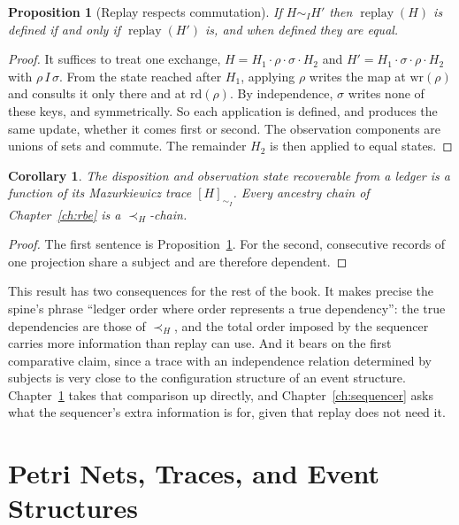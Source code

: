 \documentclass[11pt,openany]{book}
\newtheorem{proposition}[theorem]{Proposition}
\newtheorem{corollary}[theorem]{Corollary}
\theoremstyle{remark}
\newcommand{\replay}{\operatorname{replay}}
\begin{document}
\begin{proposition}[Replay respects commutation]\label{prop:commute}
If $H\sim_I H'$ then $\replay(H)$ is defined if and only if $\replay(H')$
is, and when defined they are equal.
\end{proposition}

\begin{proof}
It suffices to treat one exchange, $H=H_1\cdot\rho\cdot\sigma\cdot H_2$ and
$H'=H_1\cdot\sigma\cdot\rho\cdot H_2$ with $\rho\,I\,\sigma$. From the
state reached after $H_1$, applying $\rho$ writes the map at
$\mathrm{wr}(\rho)$ and consults it only there and at $\mathrm{rd}(\rho)$.
By independence, $\sigma$ writes none of these keys, and symmetrically. So each application is defined, and produces the same
update, whether it comes first or second. The observation components are
unions of sets and commute. The remainder $H_2$ is then applied to equal
states.
\end{proof}

\begin{corollary}
The disposition and observation state recoverable from a ledger is a
function of its Mazurkiewicz trace $[H]_{\sim_I}$. Every ancestry chain of
Chapter~\ref{ch:rbe} is a $\prec_H$-chain.
\end{corollary}

\begin{proof}
The first sentence is Proposition~\ref{prop:commute}. For the second,
consecutive records of one projection share a subject and are therefore
dependent.
\end{proof}

This result has two consequences for the rest of the book. It makes
precise the spine's phrase ``ledger order where order represents a true
dependency'': the true dependencies are those of $\prec_H$, and the total
order imposed by the sequencer carries more information than replay can
use. And it bears on the first comparative claim, since a trace with an
independence relation determined by subjects is very close to the
configuration structure of an event structure. Chapter~\ref{ch:eventstructures} takes that
comparison up directly, and Chapter~\ref{ch:sequencer} asks what the sequencer's extra
information is for, given that replay does not need it.

\chapter{Petri Nets, Traces, and Event Structures}
\label{ch:eventstructures}
\end{document}
